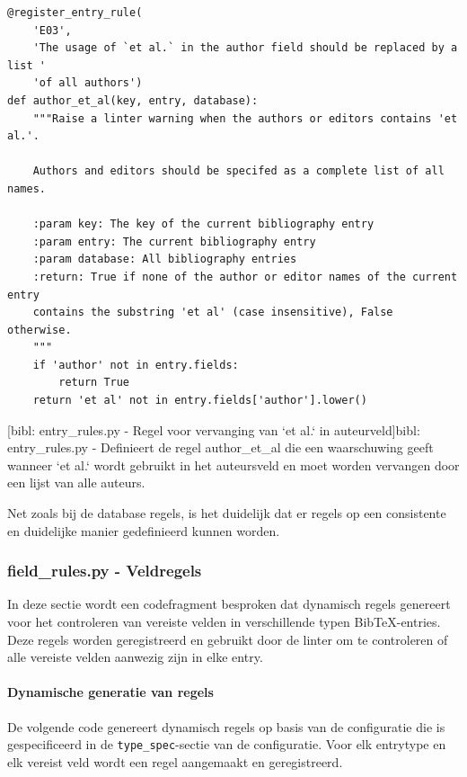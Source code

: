 \begin{verbatim}
@register_entry_rule(
    'E03',
    'The usage of `et al.` in the author field should be replaced by a list '
    'of all authors')
def author_et_al(key, entry, database):
    """Raise a linter warning when the authors or editors contains 'et al.'.

    Authors and editors should be specifed as a complete list of all names.

    :param key: The key of the current bibliography entry
    :param entry: The current bibliography entry
    :param database: All bibliography entries
    :return: True if none of the author or editor names of the current entry
    contains the substring 'et al' (case insensitive), False otherwise.
    """
    if 'author' not in entry.fields:
        return True
    return 'et al' not in entry.fields['author'].lower()
\end{verbatim}
[bibl: entry\_rules.py - Regel voor vervanging van `et al.` in auteurveld]{bibl: entry\_rules.py - Definieert de regel author\_et\_al die een waarschuwing geeft wanneer `et al.` wordt gebruikt in het auteursveld en moet worden vervangen door een lijst van alle auteurs. \label{lst:bibl_entry_rules_author_et_al}}

Net zoals bij de database regels, is het duidelijk dat er regels op een consistente en duidelijke manier gedefinieerd kunnen worden.


\subsubsection{field\_rules.py - Veldregels}

In deze sectie wordt een codefragment besproken dat dynamisch regels genereert voor het controleren van vereiste velden in verschillende typen BibTeX-entries. Deze regels worden geregistreerd en gebruikt door de linter om te controleren of alle vereiste velden aanwezig zijn in elke entry.

\paragraph{Dynamische generatie van regels}

De volgende code genereert dynamisch regels op basis van de configuratie die is gespecificeerd in de \texttt{type\_spec}-sectie van de configuratie. Voor elk entrytype en elk vereist veld wordt een regel aangemaakt en geregistreerd.

